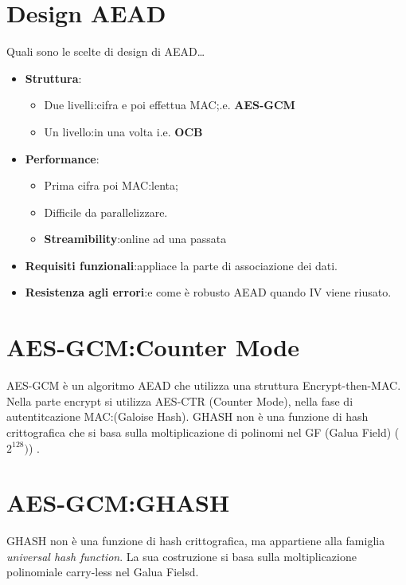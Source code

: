 \documentclass{book}
\theoremstyle{remark}
\begin{document}
\section{Design AEAD}
Quali sono le scelte di design di AEAD\dots
\begin{itemize}
	\item \textbf{Struttura}:\@\begin{itemize}
		      \item Due livelli:\@prima cifra e poi effettua MAC;\@i\@.e\@. \textbf{AES-GCM}
		      \item Un livello:\@tutto in una volta i\@.e\@. \textbf{OCB}
	      \end{itemize}
	\item \textbf{Performance}:\@\begin{itemize}
		      \item Prima cifra poi MAC:\@soluzione lenta;\@
		      \item Difficile da parallelizzare\@.
		      \item \textbf{Streamibility}:\@cipher online ad una passata
	      \end{itemize}
	\item \textbf{Requisiti funzionali}:\@Dobe appliace la parte di associazione dei dati\@.
	\item \textbf{Resistenza agli errori}:\@Quanto e come è robusto AEAD quando IV viene riusato\@.
\end{itemize}
\section{AES-GCM:\@Galois Counter Mode}
AES-GCM è un algoritmo AEAD che utilizza una struttura Encrypt-then-MAC\@. Nella parte encrypt si utilizza AES-CTR (Counter Mode),
nella fase di autentitcazione MAC:\@GHASH (Galoise Hash)\@. GHASH non è una funzione di hash crittografica che si basa sulla moltiplicazione
di polinomi nel GF (Galua Field) (\(2^{128})\)) \@.\newline
\section{AES-GCM:GHASH}
GHASH non è una funzione di hash crittografica, ma appartiene alla famiglia \emph{universal hash function}\@. La sua costruzione si basa
sulla moltiplicazione polinomiale carry-less nel Galua Fielsd\@.
\end{document}
